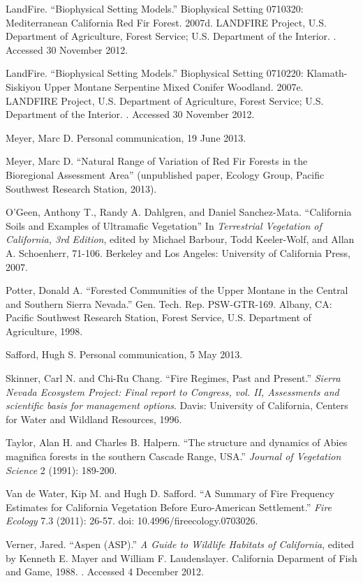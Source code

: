 \begin{hangparas}{.25in}{1}
LandFire. ``Biophysical Setting Models.'' Biophysical Setting 0710320: Mediterranean California Red Fir Forest. 2007d. LANDFIRE Project, U.S. Department of Agriculture, Forest Service; U.S. Department of the Interior. . Accessed 30 November 2012.

LandFire. ``Biophysical Setting Models.'' Biophysical Setting 0710220: Klamath-Siskiyou Upper Montane Serpentine Mixed Conifer Woodland. 2007e. LANDFIRE Project, U.S. Department of Agriculture, Forest Service; U.S. Department of the Interior. . Accessed 30 November 2012.

Meyer, Marc D. Personal communication, 19 June 2013.

Meyer, Marc D. ``Natural Range of Variation of Red Fir Forests in the Bioregional Assessment Area'' (unpublished paper, Ecology Group, Pacific Southwest Research Station, 2013).

O’Geen, Anthony T., Randy A. Dahlgren, and Daniel Sanchez-Mata. ``California Soils and Examples of Ultramafic Vegetation'' In \emph{Terrestrial Vegetation of California, 3rd Edition}, edited by Michael Barbour, Todd Keeler-Wolf, and Allan A. Schoenherr, 71-106. Berkeley and Los Angeles: University of California Press, 2007. 

Potter, Donald A. ``Forested Communities of the Upper Montane in the Central and Southern Sierra Nevada.'' Gen. Tech. Rep. PSW-GTR-169. Albany, CA: Pacific Southwest Research Station, Forest Service, U.S. Department of Agriculture, 1998.

Safford, Hugh S. Personal communication, 5 May 2013.

Skinner, Carl N. and Chi-Ru Chang. ``Fire Regimes, Past and Present.'' \emph{Sierra Nevada Ecosystem Project: Final report to Congress, vol. II, Assessments and scientific basis for management options}. Davis: University of California, Centers for Water and Wildland Resources, 1996.

Taylor, Alan H. and Charles B. Halpern. ``The structure and dynamics of Abies magnifica forests in the southern Cascade Range, USA.'' \emph{Journal of Vegetation Science} 2 (1991): 189-200.

Van de Water, Kip M. and Hugh D. Safford. ``A Summary of Fire Frequency Estimates for California Vegetation Before Euro-American Settlement.'' \emph{Fire Ecology} 7.3 (2011): 26-57. doi: 10.4996/fireecology.0703026.

Verner, Jared. ``Aspen (ASP).'' \emph{A Guide to Wildlife Habitats of California}, edited by Kenneth E. Mayer and William F. Laudenslayer. California Deparment of Fish and Game, 1988. . Accessed 4 December 2012.

\end{hangparas}

